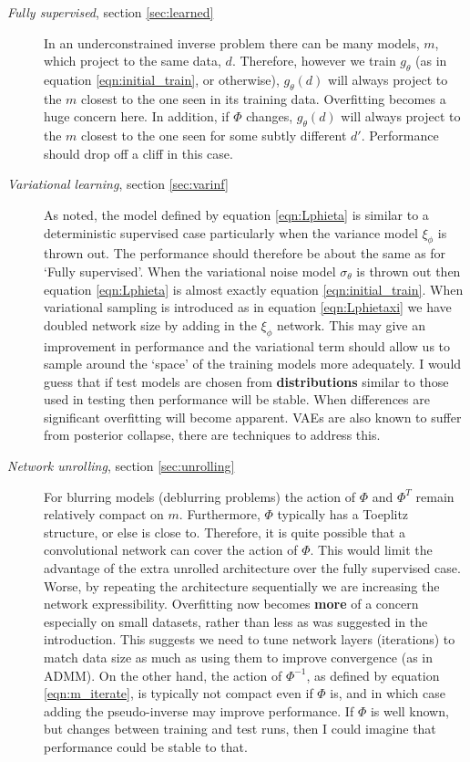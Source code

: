 \documentclass[12pt]{article}
\begin{document}
\begin{description}
\item[\textit{Fully supervised}, section \ref{sec:learned}] 
In an underconstrained inverse problem there can be many models, $m$, which project to the same data, $d$. Therefore, however we train $g_{\theta}$ (as in equation \ref{eqn:initial_train}, or otherwise), $g_{\theta}(d)$ will always project to the $m$ closest to the one seen in its training data. Overfitting becomes a huge concern here. In addition, if $\Phi$ changes, $g_{\theta}(d)$ will always project to the $m$ closest to the one seen for some subtly different $d'$. Performance should drop off a cliff in this case.

\item[\textit{Variational learning}, section \ref{sec:varinf}] 
As noted, the model defined by equation \ref{eqn:Lphieta} is similar to a deterministic supervised case particularly when the variance model $\xi_{\phi}$ is thrown out. The performance should therefore be about the same as for `Fully supervised'. When the variational noise model $\sigma_{\theta}$ is thrown out then equation \ref{eqn:Lphieta} is almost exactly equation \ref{eqn:initial_train}.
When variational sampling is introduced as in equation \ref{eqn:Lphietaxi} we have doubled network size by adding in the $\xi_{\phi}$ network. This may give an improvement in performance and the variational term should allow us to sample around the `space' of the training models more adequately. I would guess that if test models are chosen from \textbf{distributions} similar to those used in testing then performance will be stable. When differences are significant overfitting will become apparent. VAEs are also known to suffer from posterior collapse, there are techniques to address this. 

\item[\textit{Network unrolling}, section \ref{sec:unrolling}] For blurring models (deblurring problems) the action of $\Phi$ and $\Phi^T$ remain relatively compact on $m$. Furthermore, $\Phi$ typically has a Toeplitz structure, or else is close to.  Therefore, it is quite possible that a convolutional network can cover the action of $\Phi$. This would limit the advantage of the extra unrolled architecture over the fully supervised case. Worse, by repeating the architecture sequentially we are increasing the network expressibility. Overfitting now becomes \textbf{more} of a concern especially on small datasets, rather than less as was suggested in the introduction. This suggests we need to tune network layers (iterations) to match data size as much as using them to improve convergence (as in ADMM). On the other hand, the action of $\Phi^{-1}$, as defined by equation \ref{eqn:m_iterate}, is typically not compact even if $\Phi$ is, and in which case adding the pseudo-inverse may improve performance. If $\Phi$ is well known, but changes between training and test runs, then I could imagine that performance could be stable to that.
\end{description}  
\end{document}

